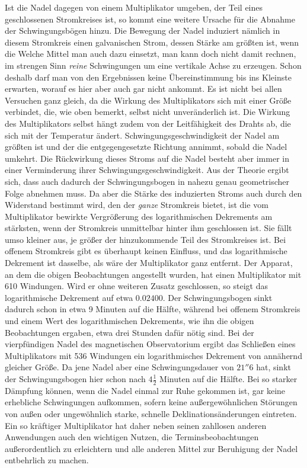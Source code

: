 Ist die Nadel dagegen von einem Multiplikator umgeben, der Teil eines geschlossenen Stromkreises ist, so kommt eine weitere Ursache für die Abnahme der Schwingungsbögen hinzu. Die Bewegung der Nadel induziert nämlich in diesem Stromkreis einen galvanischen Strom, dessen Stärke am größten ist, wenn die
\expandafter\def\csname HistoricalNoteText393\endcsname{Welche Mittel man auch dazu einsetzt, man kann doch nicht damit rechnen, im strengen Sinn \textit{reine} Schwingungen um eine vertikale Achse zu erzeugen. Schon deshalb darf man von den Ergebnissen keine Übereinstimmung bis ins Kleinste erwarten, worauf es hier aber auch gar nicht ankommt.}
\expandafter\def\csname HistoricalNoteText392\endcsname{Es ist nicht bei allen Versuchen ganz gleich, da die Wirkung des Multiplikators sich mit einer Größe verbindet, die, wie oben bemerkt, selbst nicht unveränderlich ist. Die Wirkung des Multiplikators selbst hängt zudem von der Leitfähigkeit des Drahts ab, die sich mit der Temperatur ändert.}
Schwingungsgeschwindigkeit der Nadel am größten ist und der die entgegengesetzte Richtung annimmt, sobald die Nadel umkehrt. Die Rückwirkung dieses Stroms auf die Nadel besteht aber immer in einer Verminderung ihrer Schwingungsgeschwindigkeit. Aus der Theorie ergibt sich, dass auch dadurch der Schwingungsbogen in nahezu genau geometrischer Folge abnehmen muss. Da aber die Stärke des induzierten Stroms auch durch den Widerstand bestimmt wird, den der \textit{ganze} Stromkreis bietet, ist die vom Multiplikator bewirkte Vergrößerung des logarithmischen Dekrements am stärksten, wenn der Stromkreis unmittelbar hinter ihm geschlossen ist. Sie fällt umso kleiner aus, je größer der hinzukommende Teil des Stromkreises ist. Bei offenem Stromkreis gibt es überhaupt keinen Einfluss, und das logarithmische Dekrement ist dasselbe, als wäre der Multiplikator ganz entfernt. Der Apparat, an dem die obigen Beobachtungen angestellt wurden, hat einen Multiplikator mit 610 Windungen. Wird er ohne weiteren Zusatz geschlossen, so steigt das logarithmische Dekrement auf etwa $0.02400$. Der Schwingungsbogen sinkt dadurch schon in etwa 9 Minuten auf die Hälfte, während bei offenem Stromkreis und einem Wert des logarithmischen Dekrements, wie ihn die obigen Beobachtungen ergaben, etwa drei Stunden dafür nötig sind. Bei der vierpfündigen Nadel des magnetischen Observatorium ergibt das Schließen eines Multiplikators mit 536 Windungen ein logarithmisches Dekrement von annähernd gleicher Größe. Da jene Nadel aber eine Schwingungsdauer von $21''6$ hat, sinkt der Schwingungsbogen hier schon nach $4\tfrac12$ Minuten auf die Hälfte. Bei so starker Dämpfung können, wenn die Nadel einmal zur Ruhe gekommen ist, gar keine erhebliche Schwingungen aufkommen, sofern keine außergewöhnlichen Störungen von außen oder ungewöhnlich starke, schnelle Deklinationsänderungen eintreten. Ein so kräftiger Multiplikator hat daher neben seinen zahllosen anderen Anwendungen auch den wichtigen Nutzen, die Terminsbeobachtungen außerordentlich zu erleichtern und alle anderen Mittel zur Beruhigung der Nadel entbehrlich zu machen.

